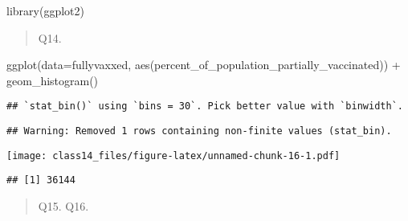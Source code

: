 \documentclass[
]{article}
\newenvironment{Shaded}{\begin{snugshade}}{\end{snugshade}}
\newcommand{\AttributeTok}[1]{\textcolor[rgb]{0.77,0.63,0.00}{#1}}
\newcommand{\DecValTok}[1]{\textcolor[rgb]{0.00,0.00,0.81}{#1}}
\newcommand{\FunctionTok}[1]{\textcolor[rgb]{0.00,0.00,0.00}{#1}}
\newcommand{\NormalTok}[1]{#1}
\newcommand{\OtherTok}[1]{\textcolor[rgb]{0.56,0.35,0.01}{#1}}
\newcommand{\SpecialCharTok}[1]{\textcolor[rgb]{0.00,0.00,0.00}{#1}}
\newcommand{\StringTok}[1]{\textcolor[rgb]{0.31,0.60,0.02}{#1}}
\begin{document}
\begin{Shaded}
\begin{Highlighting}[]
\FunctionTok{library}\NormalTok{(ggplot2)}
\end{Highlighting}
\end{Shaded}

\begin{quote}
Q14.
\end{quote}

\begin{Shaded}
\begin{Highlighting}[]
\FunctionTok{ggplot}\NormalTok{(}\AttributeTok{data=}\NormalTok{fullyvaxxed, }\FunctionTok{aes}\NormalTok{(percent\_of\_population\_partially\_vaccinated)) }\SpecialCharTok{+} \FunctionTok{geom\_histogram}\NormalTok{()}
\end{Highlighting}
\end{Shaded}

\begin{verbatim}
## `stat_bin()` using `bins = 30`. Pick better value with `binwidth`.
\end{verbatim}

\begin{verbatim}
## Warning: Removed 1 rows containing non-finite values (stat_bin).
\end{verbatim}

\texttt{[image: class14\_files/figure-latex/unnamed-chunk-16-1.pdf]}

\begin{Shaded}
\end{Shaded}

\begin{verbatim}
## [1] 36144
\end{verbatim}

\begin{quote}
Q15. Q16.
\end{quote}
\end{document}
